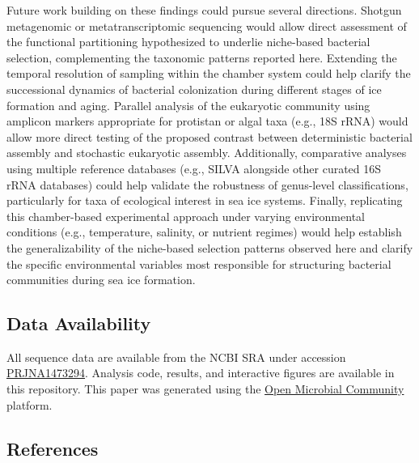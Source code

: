 \documentclass[
  11pt,
]{article}
\begin{document}
Future work building on these findings could pursue several directions.
Shotgun metagenomic or metatranscriptomic sequencing would allow direct
assessment of the functional partitioning hypothesized to underlie
niche-based bacterial selection, complementing the taxonomic patterns
reported here. Extending the temporal resolution of sampling within the
chamber system could help clarify the successional dynamics of bacterial
colonization during different stages of ice formation and aging.
Parallel analysis of the eukaryotic community using amplicon markers
appropriate for protistan or algal taxa (e.g., 18S rRNA) would allow
more direct testing of the proposed contrast between deterministic
bacterial assembly and stochastic eukaryotic assembly. Additionally,
comparative analyses using multiple reference databases (e.g., SILVA
alongside other curated 16S rRNA databases) could help validate the
robustness of genus-level classifications, particularly for taxa of
ecological interest in sea ice systems. Finally, replicating this
chamber-based experimental approach under varying environmental
conditions (e.g., temperature, salinity, or nutrient regimes) would help
establish the generalizability of the niche-based selection patterns
observed here and clarify the specific environmental variables most
responsible for structuring bacterial communities during sea ice
formation.

\subsection{Data Availability}\label{data-availability}

All sequence data are available from the NCBI SRA under accession
\href{https://www.ncbi.nlm.nih.gov/bioproject/PRJNA1473294}{PRJNA1473294}.
Analysis code, results, and interactive figures are available in this
repository. This paper was generated using the
\href{https://github.com/rec3141/omc-platform}{Open Microbial Community}
platform.

\subsection*{References}\label{references}

\protect{}\label{refs}
\end{document}
